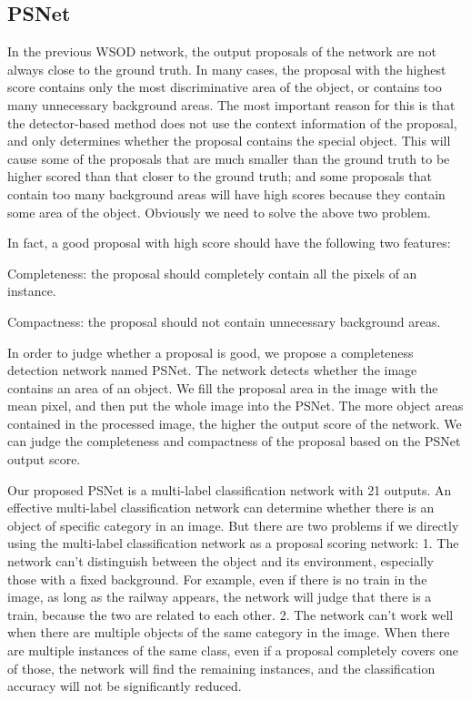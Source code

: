 \documentclass[final,3p,times,twocolumn]{elsarticle}
\begin{document}
\subsection{PSNet}
In the previous WSOD network, the output proposals of the network are not always close to the ground truth. In many cases, the proposal with the highest score contains only the most discriminative area of the object, or contains too many unnecessary background areas. The most important reason for this is that the detector-based method does not use the context information of the proposal, and only determines whether the proposal contains the special object. This will cause some of the proposals that are much smaller than the ground truth to be higher scored than that closer to the ground truth; and some proposals that contain too many background areas will have high scores because they contain some area of the object. Obviously we need to solve the above two problem.

In fact, a good proposal with high score should have the following two features:

Completeness: the proposal should completely contain all the pixels of an instance.

Compactness: the proposal should not contain unnecessary background areas.

In order to judge whether a proposal is good, we propose a completeness detection network named PSNet. The network detects whether the image contains an area of an object. We fill the proposal area in the image with the mean pixel, and then put the whole image into the PSNet. The more object areas contained in the processed image, the higher the output score of the network. We can judge the completeness and compactness of the proposal based on the PSNet output score.

Our proposed PSNet is a multi-label classification network with 21 outputs. An effective multi-label classification network can determine whether there is an object of specific category in an image. But there are two problems if we directly using the multi-label classification network as a proposal scoring network: 1. The network can't distinguish between the object and its environment, especially those with a fixed background. For example, even if there is no train in the image, as long as the railway appears, the network will judge that there is a train, because the two are related to each other. 2. The network can't work well when there are multiple objects of the same category in the image. When there are multiple instances of the same class, even if a proposal completely covers one of those, the network will find the remaining instances, and the classification accuracy will not be significantly reduced.
\end{document}
